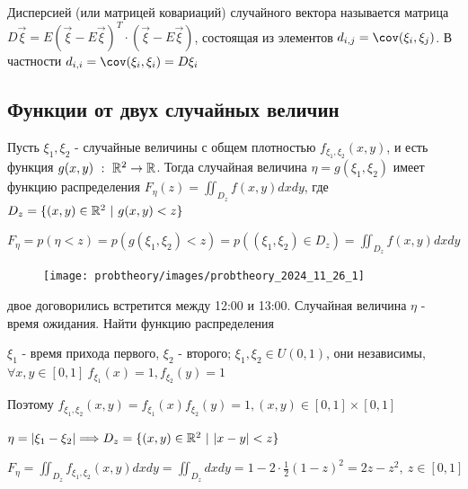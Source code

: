 \documentclass[12pt]{article}
\begin{document}
    \Def Дисперсией (или матрицей ковариаций) случайного вектора называется матрица
    $D\vec{\xi} = E(\vec{\xi} - E\vec{\xi})^T \cdot (\vec{\xi} - E\vec{\xi})$, состоящая
    из элементов $d_{i, j} = \cov (\xi_i, \xi_j)$. В частности $d_{i, i} = \cov (\xi_i, \xi_i) = D\xi_i$

    \subsection{Функции от двух случайных величин}

    \hypertarget{functionoftworandomvariables}{}

    \begin{MyTheorem}
        \Ths Пусть $\xi_1, \xi_2$ - случайные величины с общем плотностью $f_{\xi_1, \xi_2}(x, y)$, и есть функция
        $g(x, y) \ : \ \mathbb{R}^2 \rightarrow \mathbb{R}$. Тогда случайная величина $\eta = g(\xi_1, \xi_2)$ имеет
        функцию распределения $F_{\eta}(z) = \iint_{D_z} f(x, y)dxdy$, 
        где $D_z = \{(x, y) \in \mathbb{R}^2 \ | \ g(x, y) < z\}$
    \end{MyTheorem}

    \begin{MyProof}
        $F_\eta = p(\eta < z) = p(g(\xi_1, \xi_2) < z) = p((\xi_1, \xi_2) \in D_z) = \iint_{D_z} f(x, y) dxdy$
    \end{MyProof}

    \begin{minipage}{\textwidth}
        \begin{figure}
            \texttt{[image: probtheory/images/probtheory\_2024\_11\_26\_1]}
        \end{figure}

         двое договорились встретится между 12:00 и 13:00. Случайная величина $\eta$ - 
        время ожидания. Найти функцию распределения

        $\xi_1$ - время прихода первого, $\xi_2$ - второго; $\xi_1, \xi_2 \in U(0, 1)$, они независимы, 
        $\forall x, y \in [0, 1] \ f_{\xi_1}(x) = 1, f_{\xi_2}(y) = 1$

        Поэтому $f_{\xi_1, \xi_2}(x, y) = f_{\xi_1}(x) f_{\xi_2}(y) = 1, (x, y) \in [0, 1] \times [0, 1]$

        $\eta = |\xi_1 - \xi_2| \Longrightarrow D_z = \{(x, y) \in \mathbb{R}^2 \ | \ |x - y| < z\}$

        $F_\eta = \iint_{D_z} f_{\xi_1, \xi_2}(x, y) dxdy = \iint_{D_z} dxdy = 1 - 2 \cdot \frac{1}{2} (1 - z)^2 = 
        2z - z^2, \ z \in [0, 1]$
    \end{minipage}
\end{document}
